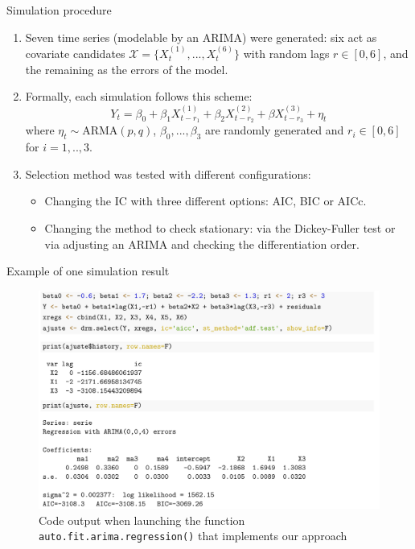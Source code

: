\documentclass[10pt]{beamer}
\begin{document}
\begin{frame}{Simulation procedure}
    \begin{enumerate}
        \item Seven time series (modelable by an ARIMA) were generated: six act as covariate candidates $\mathcal{X}=\{X_t^{(1)}, ..., X_t^{(6)}\}$ with random lags $r\in[0, 6]$, and the remaining as the errors of the model.
        \item Formally, each simulation follows this scheme:
        \[ Y_t = \beta_0 + \beta_1 X_{t-r_1}^{(1)} + \beta_2 X_{t-r_2}^{(2)} + \beta X_{t-r_3}^{(3)} + \eta_t \] 
        where $\eta_t\sim\text{ARMA}(p,q)$, $\beta_0,...,\beta_3$ are randomly generated and $r_i\in[0,6] $ for $i=1,..,3$.
        \item Selection method was tested with different configurations:
        \begin{itemize}
            \item Changing the IC with three different options: AIC, BIC or AICc.
            \item Changing the method to check stationary: via the Dickey-Fuller test or via adjusting an ARIMA and checking the differentiation order.
        \end{itemize}
    \end{enumerate}
    
\end{frame}

\begin{frame}{Example of one simulation result}
    \begin{figure}
        \caption{Code output when launching the function \texttt{auto.fit.arima.regression()} that implements our approach}
        \includegraphics[scale=0.5]{simulation-example.pdf}
    \end{figure}
    
\end{frame}
\end{document}
